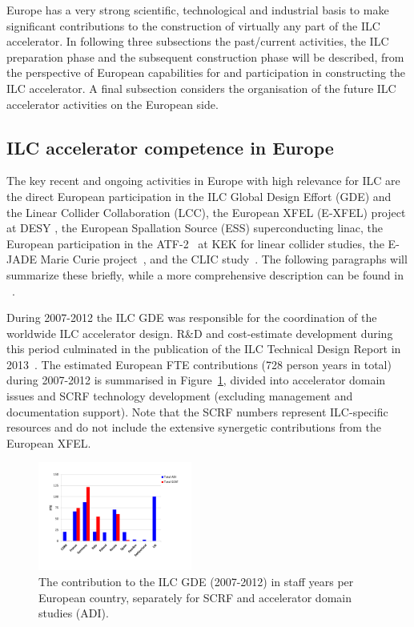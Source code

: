 \documentclass[%
 reprint,
 floatfix,
 amsmath,amssymb,
 aps,
]{revtex4-1}
\begin{document}
Europe has a very strong scientific, technological and industrial basis to make significant contributions to the construction of virtually 
any part of the ILC accelerator. In following three subsections the past/current activities, the ILC preparation phase and the subsequent construction phase 
will be described, from the perspective of European capabilities for and participation in constructing the ILC accelerator. 
A final subsection considers the organisation of the future ILC accelerator activities on the European side. 

\subsection{ILC accelerator competence in Europe~\label{sec:acc:competence}}

The key recent and ongoing activities in Europe with high relevance for ILC are the direct
European participation in the ILC Global Design Effort (GDE) and the Linear Collider Collaboration (LCC),
the European XFEL (E-XFEL) project at DESY , the European Spallation Source (ESS) superconducting linac, the European 
participation in the ATF-2~\cite{Grishanov:2005ek,Grishanov:2006kx} at KEK for linear collider studies, the E-JADE Marie 
Curie project~\cite{ejade}, and the CLIC study~\cite{Aicheler:2012bya,Linssen:2012hp}. The following paragraphs 
will summarize these briefly, while a more comprehensive description can be found in ~\cite{ejade-report}. 

During 2007-2012 the ILC GDE was responsible for the coordination of the worldwide ILC accelerator design. 
R\&D and cost-estimate development during this period culminated in the publication of the ILC Technical Design Report in 2013~\cite{Behnke:2013xla}. 
The estimated European FTE contributions (728 person years in total) during 2007-2012 is summarised in Figure~\ref{fig:PrePrep:ilcgde4}, 
divided into accelerator domain issues and SCRF technology development (excluding management and documentation support). 
Note that the SCRF numbers represent ILC-specific resources and do not include the extensive synergetic contributions from the European XFEL.

\begin{figure}[htbp]
\includegraphics[width=0.45\textwidth]{figures/EU-GDE-FTE-columns-per-country.pdf}
\caption{\label{fig:PrePrep:ilcgde4} The contribution to the ILC GDE (2007-2012) in staff years per European country, separately for SCRF and accelerator domain studies (ADI).}
\end{figure}
\end{document}
